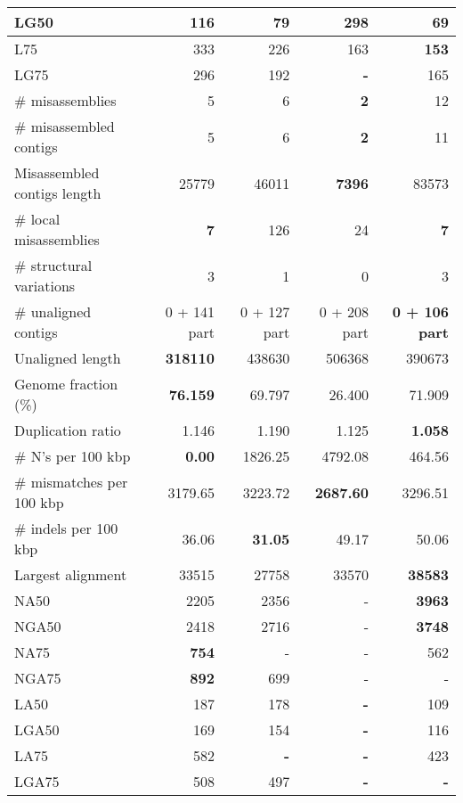 \documentclass[12pt,a4paper]{article}
\begin{document}
\begin{table}[ht]
\begin{center}
\begin{tabular}{|l*{4}{|r}|}
LG50 & 116 & 79 & 298 & {\bf 69} \\ \hline
L75 & 333 & 226 & 163 & {\bf 153} \\ \hline
LG75 & 296 & 192 & {\bf -} & 165 \\ \hline
\# misassemblies & 5 & 6 & {\bf 2} & 12 \\ \hline
\# misassembled contigs & 5 & 6 & {\bf 2} & 11 \\ \hline
Misassembled contigs length & 25779 & 46011 & {\bf 7396} & 83573 \\ \hline
\# local misassemblies & {\bf 7} & 126 & 24 & {\bf 7} \\ \hline
\# structural variations & 3 & 1 & 0 & 3 \\ \hline
\# unaligned contigs & 0 + 141 part & 0 + 127 part & 0 + 208 part & {\bf 0 + 106 part} \\ \hline
Unaligned length & {\bf 318110} & 438630 & 506368 & 390673 \\ \hline
Genome fraction (\%) & {\bf 76.159} & 69.797 & 26.400 & 71.909 \\ \hline
Duplication ratio & 1.146 & 1.190 & 1.125 & {\bf 1.058} \\ \hline
\# N's per 100 kbp & {\bf 0.00} & 1826.25 & 4792.08 & 464.56 \\ \hline
\# mismatches per 100 kbp & 3179.65 & 3223.72 & {\bf 2687.60} & 3296.51 \\ \hline
\# indels per 100 kbp & 36.06 & {\bf 31.05} & 49.17 & 50.06 \\ \hline
Largest alignment & 33515 & 27758 & 33570 & {\bf 38583} \\ \hline
NA50 & 2205 & 2356 & - & {\bf 3963} \\ \hline
NGA50 & 2418 & 2716 & - & {\bf 3748} \\ \hline
NA75 & {\bf 754} & - & - & 562 \\ \hline
NGA75 & {\bf 892} & 699 & - & - \\ \hline
LA50 & 187 & 178 & {\bf -} & 109 \\ \hline
LGA50 & 169 & 154 & {\bf -} & 116 \\ \hline
LA75 & 582 & {\bf -} & {\bf -} & 423 \\ \hline
LGA75 & 508 & 497 & {\bf -} & {\bf -} \\ \hline
\end{tabular}
\end{center}
\end{table}
\end{document}

